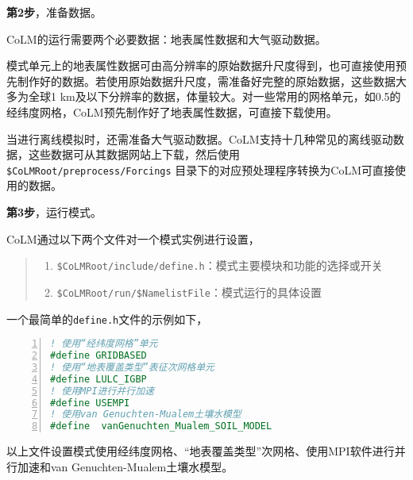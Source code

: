 \bigskip
\textbf{第2步}，准备数据。

CoLM的运行需要两个必要数据：地表属性数据和大气驱动数据。

模式单元上的地表属性数据可由高分辨率的原始数据升尺度得到，也可直接使用预先制作好的数据。若使用原始数据升尺度，需准备好完整的原始数据，这些数据大多为全球1 km及以下分辨率的数据，体量较大。对一些常用的网格单元，如0.5\textdegree 的经纬度网格，CoLM预先制作好了地表属性数据，可直接下载使用。

当进行离线模拟时，还需准备大气驱动数据。CoLM支持十几种常见的离线驱动数据，这些数据可从其数据网站上下载，然后使用 \texttt{\$CoLMRoot/preprocess/Forcings} 目录下的对应预处理程序转换为CoLM可直接使用的数据。

\bigskip
\textbf{第3步}，运行模式。

CoLM通过以下两个文件对一个模式实例进行设置，
\begin{quote}
\begin{enumerate}[label=\arabic*)]
    \item \texttt{\$CoLMRoot/include/define.h}：模式主要模块和功能的选择或开关
    \item \texttt{\$CoLMRoot/run/\$NamelistFile}：模式运行的具体设置
\end{enumerate}
\end{quote}

一个最简单的\texttt{define.h}文件的示例如下，
\begin{lstlisting}[language=fortran, basicstyle=\linespread{1.2}\footnotesize\ttfamily, commentstyle=\color{olive}, numbers=left, numberstyle=\tiny, xleftmargin=1.5em,xrightmargin=0em, aboveskip=1em]
! 使用“经纬度网格”单元
#define GRIDBASED
! 使用“地表覆盖类型”表征次网格单元
#define LULC_IGBP
! 使用MPI进行并行加速
#define USEMPI
! 使用van Genuchten-Mualem土壤水模型
#define  vanGenuchten_Mualem_SOIL_MODEL
\end{lstlisting}

以上文件设置模式使用经纬度网格、“地表覆盖类型”次网格、使用MPI软件进行并行加速和van Genuchten-Mualem土壤水模型。

